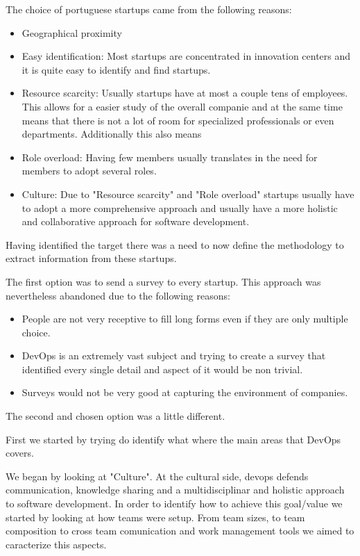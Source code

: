 \documentclass[runningheads,a4paper]{llncs}
\begin{document}
The choice of portuguese startups came from the following reasons:
	\begin{itemize}	
		\item Geographical proximity
		\item Easy identification: Most startups are concentrated in innovation centers and it is quite easy to identify and find startups.
		\item Resource scarcity: Usually startups have at most a couple tens of employees. This allows for a easier study of the overall companie and at the same time means that there is not a lot of room for specialized professionals or even departments. Additionally this also means 
		\item Role overload: Having few members usually translates in the need for members to adopt several roles.
		\item Culture: Due to "Resource scarcity" and "Role overload" startups usually have to adopt a more comprehensive approach and usually have a more holistic and collaborative approach for software development.
	\end{itemize}
Having identified the target there was a need to now define the methodology to extract information from these startups. 

The first option was to send a survey to every startup. This approach was nevertheless abandoned due to the following reasons:
	\begin{itemize}	
		\item People are not very receptive to fill long forms even if they are only multiple choice.
		\item DevOps is an extremely vast subject and trying to create a survey that identified every single detail and aspect of it would be non trivial.
		\item Surveys would not be very good at capturing the environment of companies.
	\end{itemize}
The second and chosen option was a little different. 

First we started by trying do identify what where the main areas that DevOps covers. 

We began by looking at "Culture". At the cultural side, devops defends communication, knowledge sharing and a multidisciplinar and holistic approach to software development. In order to identify how to achieve this goal/value we started by looking at how teams were setup. From team sizes, to team composition to cross team comunication and work management tools we aimed to caracterize this aspects. 
\end{document}
